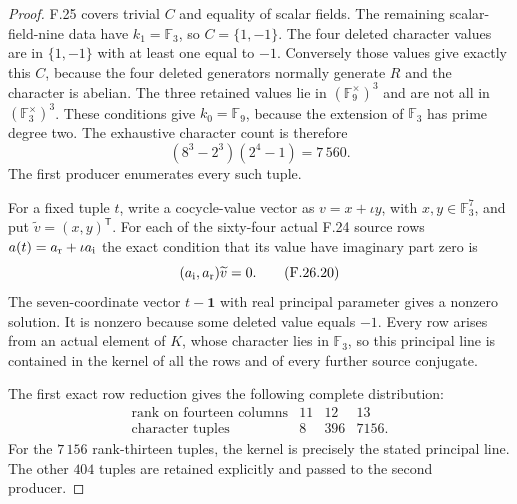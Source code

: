 \begin{proof}
F.25 covers trivial $C$ and equality of scalar
fields. The remaining scalar-field-nine data
have $k_1=\mathbb F_3$, so $C=\{1,-1\}$.
The four deleted character values are in
$\{1,-1\}$ with at least one equal to $-1$.
Conversely those values give exactly this $C$,
because the four deleted generators normally
generate $R$ and the character is abelian.
The three retained values lie in
$(\mathbb F_9^\times)^3$ and are not all in
$(\mathbb F_3^\times)^3$. These conditions give
$k_0=\mathbb F_9$, because the extension of
$\mathbb F_3$ has prime degree two. The exhaustive
character count is therefore
\[
                   (8^3-2^3)(2^4-1)=7\,560 .                  \tag{F.26.19}
\]
The first producer enumerates every such tuple.

For a fixed tuple $t$, write a cocycle-value vector
as $v=x+\iota y$, with $x,y\in\mathbb F_3^7$,
and put $\widetilde v=(x,y)^{\mathsf T}$.
For each of the sixty-four actual F.24 source rows
$a(t)=a_{\rm r}+\iota a_{\rm i}$ the exact condition
that its value have imaginary part zero is
\[
       (a_{\rm i},a_{\rm r})\widetilde v=0 .                   \tag{F.26.20}
\]
The seven-coordinate vector $t-\mathbf1$ with real
principal parameter gives a nonzero solution.
It is nonzero because some deleted value equals
$-1$. Every row arises from an actual element
of $K$, whose character lies in $\mathbb F_3$,
so this principal line is contained in the
kernel of all the rows and of every further
source conjugate.

The first exact row reduction gives the following
complete distribution:
\[
 \begin{array}{c|rrr}
 \text{rank on fourteen columns}&11&12&13\\\hline
 \text{character tuples}&8&396&7156 .
 \end{array}                                                  \tag{F.26.21}
\]
For the $7\,156$ rank-thirteen tuples, the kernel
is precisely the stated principal line.
The other $404$ tuples are retained explicitly
and passed to the second producer.


\end{proof}
